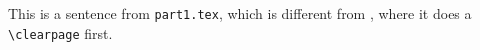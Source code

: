 This is a sentence from \texttt{part1.tex}, which is different from \verb||, where it does a \verb|\clearpage| first.